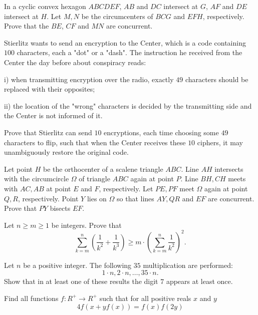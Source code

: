 \documentclass[11pt]{scrartcl}
\begin{document}
\begin{problem}[409530198849693]
In a cyclic convex hexagon $ABCDEF$, $AB$ and $DC$ intersect at $G$, $AF$ and $DE$ intersect at $H$. Let $M, N$ be the circumcenters of $BCG$ and $EFH$, respectively. Prove that the $BE$, $CF$ and $MN$ are concurrent.
\end{problem}
\begin{problem}[966139221944695]
Stierlitz wants to send an encryption to the Center, which is a code containing $100$ characters, each a "dot" or a "dash". The instruction he received from the Center the day before about conspiracy reads:

i) when transmitting encryption over the radio, exactly $49$ characters should be replaced with their opposites;

ii) the location of the "wrong" characters is decided by the transmitting side and the Center is not informed of it.

Prove that Stierlitz can send $10$ encryptions, each time choosing some $49$ characters to flip, such that when the Center receives these $10$ ciphers, it may unambiguously restore the original code.
\end{problem}
\begin{problem}[844684477828422]
Let point $H$ be the orthocenter of a scalene triangle $ABC$. Line $AH$ intersects with the circumcircle $\Omega$ of triangle $ABC$ again at point $P$. Line $BH, CH$ meets with $AC,AB$ at point $E$ and $F$, respectively. Let $PE, PF$ meet $\Omega$ again at point $Q,R$, respectively. Point $Y$ lies on $\Omega$ so that lines $AY,QR$ and $EF$ are concurrent. Prove that $PY$ bisects $EF$.
\end{problem}
\begin{problem}[5968448186928885521]
Let $n\ge m\ge 1$ be integers. Prove that
\[\sum_{k=m}^n \left (\frac 1{k^2}+\frac 1{k^3}\right) \ge m\cdot \left(\sum_{k=m}^n \frac 1{k^2}\right)^2.\]
\end{problem}
\begin{problem}[7284124089748055531]
Let $n$ be a positive integer. The following $35$ multiplication are performed:
$$1 \cdot n, 2 \cdot n, \dots, 35 \cdot n.$$Show that in at least one of these results the digit $7$ appears at least once.
\end{problem}
\begin{problem}[770681078031656]
Find all functions $f:R^+\rightarrow R^+$ such that for all positive reals $x$ and $y$
$$4f(x+yf(x))=f(x)f(2y)$$
\end{problem}
\end{document}
